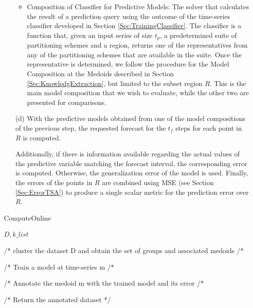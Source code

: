 \begin{itemize}
\begin{itemize}
	\item Composition of Classifier for Predictive Models: The solver that calculates the result of a prediction query using the outcome of the time-series classifier developed in Section \ref{Sec:TrainingClassifier}. The classifier is a function that, given an input series of size $t_p$, a predetermined suite of partitioning schemes and a region, returns one of the representatives from any of the partitioning schemes that are available in the suite. Once the representative is determined, we follow the procedure for the Model Composition at the Medoids described in Section \ref{Sec:KnowledgExtraction}, but limited to the subset region $R$. This is the main model composition that we wish to evaluate, while the other two are presented for comparisons.
    \end{itemize}
    \item [(d)] With the predictive models obtained from one of the model compositions of the previous step, the requested forecast for the $t_{f}$ steps for each point in $R$ is computed. 
    
    Additionally, if there is information available regarding the actual values of the predictive variable matching the forecast interval, the corresponding error is computed. Otherwise, the generalization error of the model is used. Finally, the errors of the points in $R$ are combined using MSE (see Section \ref{Sec:ErrorTSA}) to produce a single scalar metric for the prediction error over $R$.
\end{itemize}

\begin{algorithm}[h!]
\caption{ComputeOnline}\label{alg:online}
\begin{algorithmic}[1] 
 {$D,k\_list $}


 /* cluster the dataset D and obtain the set of groups and associated medoids  /*
 
 
 /* Train a model at time-series m /*
 
 /* Annotate the medoid m with the trained model and its error /*
 \EndFor
 
 
\EndFor

/* Return the annotated dataset */

\EndFunction 
\end{algorithmic} 
\end{algorithm} 

